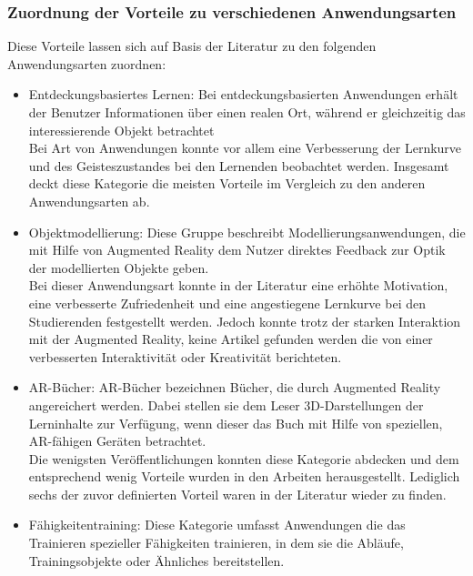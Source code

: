 \subsubsection{Zuordnung der Vorteile zu verschiedenen Anwendungsarten}
Diese Vorteile lassen sich auf Basis der Literatur zu den folgenden Anwendungsarten zuordnen:
\begin{itemize}
\item Entdeckungsbasiertes Lernen: Bei entdeckungsbasierten Anwendungen erhält der Benutzer \glqq Informationen über einen realen Ort, während er gleichzeitig das interessierende Objekt betrachtet\grqq{} \citep[Kapitel 2.2]{diegmann:benefits-ar} \\
Bei Art von Anwendungen konnte vor allem eine Verbesserung der Lernkurve und des Geisteszustandes bei den Lernenden beobachtet werden. Insgesamt deckt diese Kategorie die meisten Vorteile im Vergleich zu den anderen Anwendungsarten ab. \citep[Kapitel 5]{diegmann:benefits-ar}
\item Objektmodellierung: Diese Gruppe beschreibt Modellierungsanwendungen, die mit Hilfe von Augmented Reality dem Nutzer direktes Feedback zur Optik der modellierten Objekte geben. \citep[Kapitel 2.2]{diegmann:benefits-ar} \\
Bei dieser Anwendungsart konnte in der Literatur eine erhöhte Motivation, eine verbesserte Zufriedenheit und eine angestiegene Lernkurve bei den Studierenden festgestellt werden. Jedoch konnte trotz der starken Interaktion mit der Augmented Reality, keine Artikel gefunden werden die von einer verbesserten Interaktivität oder Kreativität berichteten. \citep[Kapitel 5]{diegmann:benefits-ar}
\item AR-Bücher: AR-Bücher bezeichnen Bücher, die durch Augmented Reality angereichert werden. Dabei stellen sie dem Leser 3D-Darstellungen der Lerninhalte zur Verfügung, wenn dieser das Buch mit Hilfe von speziellen, AR-fähigen Geräten betrachtet. \citep[Kapitel 2.2]{diegmann:benefits-ar}\\
Die wenigsten Veröffentlichungen konnten diese Kategorie abdecken und dem entsprechend wenig Vorteile wurden in den Arbeiten herausgestellt. Lediglich sechs der zuvor definierten Vorteil waren in der Literatur wieder zu finden. \citep[Kapitel 5]{diegmann:benefits-ar}
\item Fähigkeitentraining: Diese Kategorie umfasst Anwendungen die das Trainieren spezieller Fähigkeiten trainieren, in dem sie die Abläufe, Trainingsobjekte oder Ähnliches bereitstellen. \citep[Kapitel 2.2]{diegmann:benefits-ar} \\

\end{itemize}
